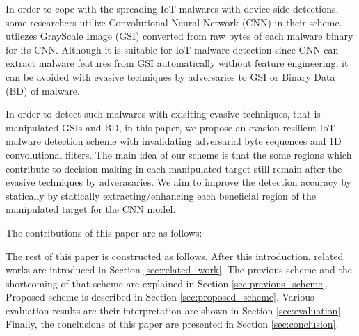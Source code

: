 In order to cope with the spreading IoT malwares with device-side detections, some researchers utilize Convolutional Neural Network (CNN) in their scheme.
\cite{} utilezes GrayScale Image (GSI) converted from raw bytes of each malware binary for its CNN.
Although it is suitable for IoT malware detection since CNN can extract malware features from GSI automatically without feature engineering, it can be avoided with evasive techniques by adversaries to GSI or Binary Data (BD) of malware. 

In order to detect such malwares with exisiting evasive techniques, that is manipulated GSIs and BD, in this paper, we propose an evasion-resilient IoT malware detection scheme with invalidating adversarial byte sequences and 1D convolutional filters.
The main idea of our scheme is that the some regions which contribute to decision making in each manipulated target still remain after the evasive techniques by adverasaries. 
We aim to improve the detection accuracy by statically by statically extracting/enhancing each beneficial region of the manipulated target for the CNN model.

The contributions of this paper are as follows: 

The rest of this paper is constructed as follows. 
After this introduction, related works are introduced in Section \ref{sec:related_work}.
The previous scheme and the shortcoming of that scheme are explained in Section \ref{sec:previous_scheme}.
Proposed scheme is described in Section \ref{sec:proposed_scheme}.
Various evaluation results are their interpretation are shown in Section \ref{sec:evaluation}.
Finally, the conclusions of this paper are presented in Section \ref{sec:conclusion}.

